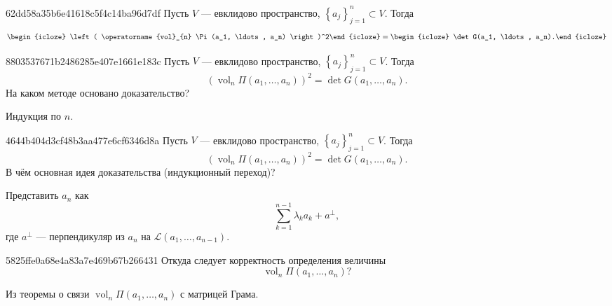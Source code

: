 \begin{note}{62dd58a35b6e41618c5f4c14ba96d7df}
    Пусть \({ V }\) --- евклидово пространство, \({ \left\{ a_j \right\}_{j = 1}^{n} \subset V }\).
    Тогда
    \[
        \begin{icloze}{2}\left( \operatorname{vol}_{n} \Pi(a_1, \ldots, a_n) \right)^2\end{icloze} = \begin{icloze}{1}\det G(a_1, \ldots, a_n).\end{icloze}
    \]
\end{note}

\begin{note}{8803537671b2486285e407e1661e183c}
    Пусть \({ V }\) --- евклидово пространство, \({ \left\{ a_j \right\}_{j = 1}^{n} \subset V }\).
    Тогда
    \[
        \left( \operatorname{vol}_{n} \Pi(a_1, \ldots, a_n) \right)^2 =  \det G(a_1, \ldots, a_n).
    \]
    На каком методе основано  доказательство?

    \begin{cloze}{1}
        Индукция по \({ n }\).
    \end{cloze}
\end{note}

\begin{note}{4644b404d3cf48b3aa477e6cf6346d8a}
    Пусть \({ V }\) --- евклидово пространство, \({ \left\{ a_j \right\}_{j = 1}^{n} \subset V }\).
    Тогда
    \[
        \left( \operatorname{vol}_{n} \Pi(a_1, \ldots, a_n) \right)^2 =  \det G(a_1, \ldots, a_n).
    \]
    В чём основная идея доказательства (индукционный переход)?

    \begin{cloze}{1}
        Представить \({ a_n }\) как
        \[
            \sum_{k=1}^{n - 1} \lambda_k a_k + a^{\perp},
        \]
        где \({ a^{\perp} }\) --- перпендикуляр из \({ a_n }\) на \({ \mathscr L (a_1, \ldots, a_{n - 1}) }\).
    \end{cloze}
\end{note}

\begin{note}{5825ffe0a68e4a83a7e469b67b266431}
    Откуда следует корректность определения величины
    \[
        \operatorname{vol}_{n} \Pi(a_1, \ldots, a_n)?
    \]

    \begin{cloze}{1}
        Из теоремы о связи \({ \operatorname{vol}_{n} \Pi(a_1, \ldots, a_n) }\) с матрицей Грама.
    \end{cloze}
\end{note}

